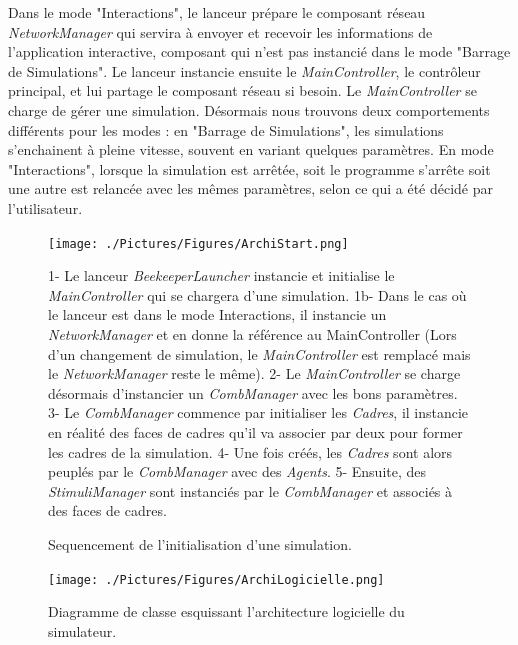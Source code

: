 			 Dans le mode "Interactions", le lanceur prépare le composant réseau \textit{NetworkManager} qui servira à envoyer et recevoir les informations de l'application interactive, composant qui n'est pas instancié dans le mode "Barrage de Simulations". Le lanceur instancie ensuite le \textit{MainController}, le contrôleur principal, et lui partage le composant réseau si besoin. Le \textit{MainController} se charge de gérer une simulation. Désormais nous trouvons deux comportements différents pour les modes : en "Barrage de Simulations", les simulations s'enchainent à pleine vitesse, souvent en variant quelques paramètres. En mode "Interactions", lorsque la simulation est arrêtée, soit le programme s'arrête soit une autre est relancée avec les mêmes paramètres, selon ce qui a été décidé par l'utilisateur.
			 
			\begin{figure}
			\centering
			\texttt{[image: ./Pictures/Figures/ArchiStart.png]}
			\caption{Sequencement de l'initialisation d'une simulation.}{1- Le lanceur \textit{BeekeeperLauncher} instancie et initialise le \textit{MainController} qui se chargera d'une simulation. 1b- Dans le cas où le lanceur est dans le mode Interactions, il instancie un \textit{NetworkManager} et en donne la référence au MainController (Lors d'un changement de simulation, le \textit{MainController} est remplacé mais le \textit{NetworkManager} reste le même). 2- Le \textit{MainController} se charge désormais d'instancier un \textit{CombManager} avec les bons paramètres. 3- Le \textit{CombManager} commence par initialiser les \textit{Cadres}, il instancie en réalité des faces de cadres qu'il va associer par deux pour former les cadres de la simulation. 4- Une fois créés, les \textit{Cadres} sont alors peuplés par le \textit{CombManager} avec des \textit{Agents}. 5- Ensuite, des \textit{StimuliManager} sont instanciés par le \textit{CombManager} et associés à des faces de cadres.}
			\label{ArchiStart}
			\end{figure}
			
			\begin{figure}
			\centering
			\texttt{[image: ./Pictures/Figures/ArchiLogicielle.png]}
			\caption{Diagramme de classe esquissant l'architecture logicielle du simulateur.}
			\label{ArchiLogicielle}
			\end{figure}
			
